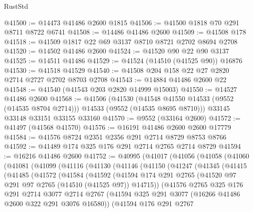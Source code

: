 \begin{lexlean}{RustStd}
\begin{coremodule}
@41500 := @14473 @41486 @2600 @1815
@41506 := @41500 @1818 @70 @291 @8711 @8722 @6741
@41508 := @14486 @41486 @2600
@41509 := @41508 @178
@41518 := @41509 @1817 @22 @69 @3137 @8710 @8721 @2702 @8694 @2708
@41520 := @14502 @41486 @2600
@41524 := @41520 @90 @22 @90 @3137
@41525 := @14511 @41486
@41529 := @41524 (@14510 (@41525 @90)) @16876
@41530 := @41518 @41529
@41540 := @41508 @204 @158 @22 @27 @2820 @2714 @2727 @2702 @8703 @2708
@41543 := @14884 @41486 @2600 @22
@41548 := @41540 (@41543 @203 @2820 @14999 @15003)
@41550 := @14527 @41486 @2600
@41568 := @41506
    (@41530 (@41548 @41550 @14533 (@9552 (@14535 @8704 @2714))) @14533 (@9552 (@14535 @8695 @8710)))
    @33145
    @33148
    @33151
    @33155
    @33160
@41570 := @9552 (@33164 @2600)
@41572 := @41497 (@41568 @41570)
@41576 := @16191 @41486 @2600 @2600 @17779
@41584 := @41576 @8724 @2351 @2356 @291 @2714 @8729 @8753 @8766
@41592 := @41489 @174 @325 @176 @291 @2714 @2765 @2714 @8729
@41594 := @16216 @41486 @2600
@41752 := @40995
    (@41017
      (@41056
        (@41058
          (@41060
            (@41081
              (@41099
                (@41116
                  (@41130
                    (@41146
                      (@41150
                        (@41247
                          (@41345
                            (@41415
                              (@41485
                                (@41572
                                  (@41584
                                    (@41592
                                      (@41594
                                        @174
                                        @291
                                        @2765
                                        (@41520 @97 @291 @97 @2765 (@14510 (@41525 @97)) @14715))
                                      (@41576
                                        @2765
                                        @325
                                        @176
                                        @291
                                        @2714
                                        @3077
                                        @2714
                                        @2767
                                        (@41594
                                          @325
                                          @291
                                          @3077
                                          (@16266 @41486 @2600 @322 @291 @3076 @16580))
                                        (@41594
                                          @176
                                          @291
                                          @2767

\end{coremodule}
\end{lexlean}
